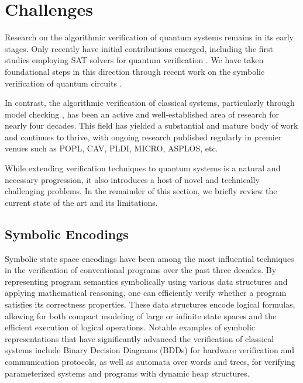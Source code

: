 \section{Challenges}
\label{challenges:section}

Research on the algorithmic verification of quantum systems remains in its early stages.
%
Only recently have initial contributions emerged, including the first studies employing SAT solvers for quantum verification \cite{DBLP:conf/cade/ChenRT23}.
%
We have taken foundational steps in this direction through recent work on the symbolic verification of quantum circuits \cite{DBLP:journals/pacmpl/AbdullaCCHLLLT25,CACM25,PLanQC25}.
%

In contrast, the algorithmic verification of classical systems, particularly through model checking \cite{DBLP:reference/mc/AbdullaST18}, has been an active and well-established area of research for nearly four decades.
%
This field has yielded a substantial and mature body of work and continues to thrive, with ongoing research published regularly in premier venues such as {\sc POPL}, {\sc CAV}, {\sc PLDI}, {\sc MICRO}, {\sc ASPLOS}, etc.
%

While extending verification techniques to quantum systems is a natural and necessary progression, it also introduces a host of novel and technically challenging problems.
%
In the remainder of this section, we briefly review the current state of the art and its limitations.
%

\subsection{Symbolic Encodings}

Symbolic state space encodings have been among the most influential techniques in the verification of conventional programs over the past three decades.
%
By representing program semantics symbolically using various data structures and applying mathematical reasoning, one can efficiently verify whether a program satisfies its correctness properties.
%
These data structures encode logical formulas, allowing for both compact modeling of large or infinite state spaces and the efficient execution of logical operations.
%
Notable examples of symbolic representations that have significantly advanced the verification of classical systems include Binary Decision Diagrams (BDDs) for hardware verification and communication protocols, as well as automata over words and trees, for verifying parameterized systems and programs with dynamic heap structures.
%

